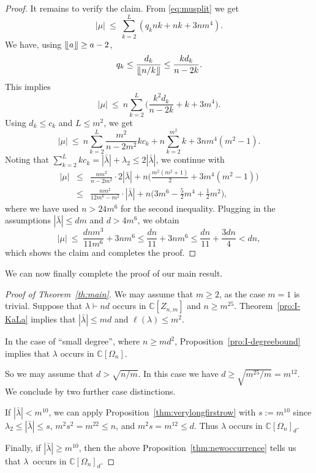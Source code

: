 \documentclass[11pt]{amsart}
\newcommand{\Det}{\Omega}
\def\la{\lambda}
\newcommand{\IC}{\ensuremath{\mathbb{C}}}
\numberwithin{equation}{section}
\begin{document}
\begin{proof}
It remains to verify the claim. 
From \eqref{eq:musplit} we get 
$$
 |\mu| \ \le\  \sum_{k=2}^L (q_k nk + nk + 3nm^4 ) .
$$
We have, using $\llfloor a \rrfloor \ge a -2$, 
$$
 q_k \le \frac{d_k}{\llfloor n/k \rrfloor} \le \frac{kd_k}{n-2k} .
$$
This implies 
$$
 |\mu| \ \le\ n \sum_{k=2}^L \Big( \frac{k^2 d_k}{n-2k} + k + 3m^4\Big) .
$$
Using $d_k \le c_k$ and $L\le m^2$, we get
$$
 |\mu| \ \le\  n \sum_{k=2}^L \frac{m^2}{n-2m^2} k c_k + n \sum_{k=2}^{m^2} k + 3nm^4 (m^2 -1) .
$$
Noting that $\sum_{k=2}^L k c_k = |\bar{\la}| + \la_2 \le 2 |\bar{\la}|$, we continue with 
\begin{eqnarray*}
 |\mu| &\le& \frac{nm^2}{n-2m^2} \cdot 2 |\bar{\la}| + 
             n \Big( \frac{m^2(m^2+1)}{2} + 3m^4(m^2 -1)\Big) \\
          &\le& \frac{nm^2}{12m^6-m^2} \cdot  |\bar{\la}| + 
             n \Big( 3m^6 -\frac52 m^4 + \frac12 m^2 \Big),
\end{eqnarray*}
where we have used $n>24m^6$ for the second inequality. 
Plugging in the assumptions $|\bar{\la}| \le dm$ and $d>4m^6$,  
we obtain
$$
 |\mu| \ \le\  \frac{dnm^3}{11m^6} + 3nm^6 \le 
  \frac{dn}{11} + 3nm^6 \le \frac{dn}{11} + \frac{3dn}{4} < dn ,
$$
which shows the claim and completes the proof.
\end{proof}

We can now finally complete the proof of our main result. 


\begin{proof}[Proof of Theorem~\ref{th:main}] 
We may assume that $m\ge 2$, as the case $m=1$ is trivial. 
Suppose that $\la\vdash nd$ occurs in $\IC[Z_{n,m}]$ and 
$n \ge m^{25}$. 
Theorem~\ref{pro:I-KaLa} implies that $|\bar\la|\leq md$ and $\ell(\la)\leq m^2$. 

In the case of ``small degree'', where $n\ge md^2$, Proposition~\ref{pro:I-degreebound} 
implies that $\la$ occurs in $\IC[\Det_n]$. 

So we may assume that $d > \sqrt{n/m}$. 
In this case we have 
$d \ge \sqrt{m^{25}/m} = m^{12}$.
We conclude by two further case distinctions.

If $|\bar\la| < m^{10}$, 
we can apply Proposition~\ref{thm:verylongfirstrow} 
with $s:=m^{10}$ since 
$\la_2 \le |\bar{\la}| \le  s$,
$m^2 s^2 = m^{22} \le n$, 
and 
$m^2 s = m^{12}\le d$.
Thus $\la$ occurs in $\IC[\Det_n]_d$. 

Finally, 
if $|\bar\la| \geq m^{10}$, 
then the above Proposition~\ref{thm:newoccurrence} tells us that 
$\la$~occurs in $\IC[\Det_n]_d$.
\end{proof}
\end{document}
